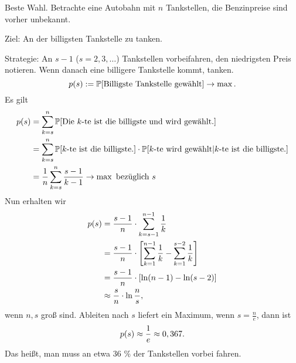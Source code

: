\begin{exmp}
  Beste Wahl. Betrachte eine Autobahn mit $n$ Tankstellen, die Benzinpreise sind vorher
  unbekannt.

  Ziel: An der billigsten Tankstelle zu tanken.

  Strategie: An $s-1$ ($s=2,3, \ldots$) Tankstellen vorbeifahren, den
  niedrigsten Preis notieren. Wenn danach eine billigere Tankstelle kommt,
  tanken.
  \[ p(s) := \mathbb{P}[ \text{Billigste Tankstelle gewählt}] \to \max. \]
  Es gilt
  \begin{align*}
    p(s) &= \sum_{k=s}^n \mathbb{P}[ \text{Die $k$-te ist die billigste und wird
           gewählt.} ] \\
         &= \sum_{k=s}^n \mathbb{P}[ \text{$k$-te ist die billigste.} ] \cdot
           \mathbb{P}[ \text{$k$-te wird gewählt} | \text{$k$-te ist die billigste.}] \\
    &= \frac{1}{n} \sum_{k=s}^n \frac{s-1}{k-1} \to \max \text{ bezüglich $s$}
  \end{align*}
  Nun erhalten wir
  \begin{align*}
    p(s) &= \frac{s-1}{n} \cdot \sum_{k=s-1}^{n-1} \frac{1}{k} \\
         &= \frac{s-1}{n} \cdot \left[ \sum_{k=1}^{n-1} \frac{1}{k} - \sum_{k=1}^{s-2} \frac{1}{k} \right] \\
         &= \frac{s-1}{n} \cdot [ \ln(n-1) - \ln(s-2)] \\
         &\approx \frac{s}{n} \cdot \ln \frac{n}{s},
  \end{align*}
  wenn $n, s$ groß sind. Ableiten nach $s$ liefert ein Maximum, wenn $s =
  \frac{n}{e}$, dann ist
  \[ p(s) \approx \frac{1}{e} \approx 0,367. \]
  Das heißt, man muss an etwa 36 \% der Tankstellen vorbei fahren.
\end{exmp}